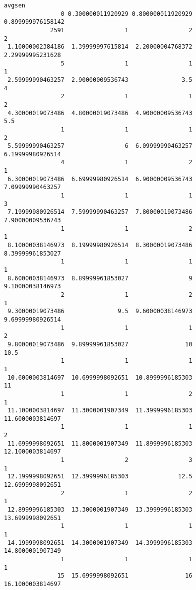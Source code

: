 \documentclass[
  letterpaper,
  DIV=11,
  numbers=noendperiod]{scrreprt}
\begin{document}
\begin{verbatim}
avgsen
                0 0.300000011920929 0.800000011920929 0.899999976158142 
             2591                 1                 2                 2 
 1.10000002384186  1.39999997615814  2.20000004768372  2.29999995231628 
                5                 1                 1                 1 
 2.59999990463257  2.90000009536743               3.5                 4 
                2                 1                 1                 2 
 4.30000019073486  4.80000019073486  4.90000009536743               5.5 
                1                 1                 1                 2 
 5.59999990463257                 6  6.09999990463257  6.19999980926514 
                4                 1                 2                 1 
 6.30000019073486  6.69999980926514  6.90000009536743  7.09999990463257 
                1                 1                 1                 3 
 7.19999980926514  7.59999990463257  7.80000019073486  7.90000009536743 
                1                 1                 2                 1 
 8.10000038146973  8.19999980926514  8.30000019073486  8.39999961853027 
                1                 1                 1                 1 
 8.60000038146973  8.89999961853027                 9  9.10000038146973 
                2                 1                 2                 1 
 9.30000019073486               9.5  9.60000038146973  9.69999980926514 
                1                 1                 1                 2 
 9.80000019073486  9.89999961853027                10              10.5 
                1                 1                 1                 1 
 10.6000003814697  10.6999998092651  10.8999996185303                11 
                1                 1                 2                 1 
 11.1000003814697  11.3000001907349  11.3999996185303  11.6000003814697 
                1                 1                 1                 2 
 11.6999998092651  11.8000001907349  11.8999996185303  12.1000003814697 
                1                 2                 3                 1 
 12.1999998092651  12.3999996185303              12.5  12.6999998092651 
                2                 1                 2                 1 
 12.8999996185303  13.3000001907349  13.3999996185303  13.6999998092651 
                1                 1                 1                 1 
 14.1999998092651  14.3000001907349  14.3999996185303  14.8000001907349 
                1                 1                 1                 1 
               15  15.6999998092651                16  16.1000003814697 

\end{verbatim}
\end{document}
